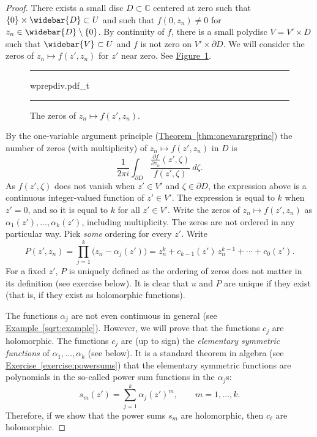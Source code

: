 \documentclass[12pt,openany]{book}
\newcommand{\C}{{\mathbb{C}}}
\theoremstyle{plain}
\theoremstyle{remark}
\theoremstyle{definition}
\newenvironment{myfig}{%
\begin{figure}[h!t]
\noindent\rule{\textwidth}{0.5pt}\vspace{12pt}\par\centering}%
{\par\noindent\rule{\textwidth}{0.5pt}
\end{figure}}
\theoremstyle{exercise}
\theoremstyle{example}
\newcommand{\figureref}[1]{\hyperref[#1]{Figure~\ref*{#1}}}
\newcommand{\exerciseref}[1]{\hyperref[#1]{Exercise~\ref*{#1}}}
\newcommand{\exampleref}[1]{\hyperref[#1]{Example~\ref*{#1}}}
\newcommand{\thmref}[1]{\hyperref[#1]{Theorem~\ref*{#1}}}
\begin{document}
\begin{proof}
There exists a small disc $D \subset \C$ centered at zero such that
$\{0\} \times \widebar{D} \subset U$ and such that
$f(0,z_n) \not= 0$ for $z_n \in \widebar{D} \setminus \{ 0 \}$.
By continuity
of $f$,
there is a small polydisc $V = V' \times D$ such that
$\widebar{V} \subset U$ and $f$ is not zero on
$V' \times \partial D$.  We will consider the zeros of
$z_n \mapsto f(z',z_n)$ for $z'$ near zero.  See \figureref{fig:wprepdiv}.

\begin{myfig}
{wprepdiv.pdf_t}
\caption{The zeros of $z_n \mapsto f(z',z_n)$.\label{fig:wprepdiv}}
\end{myfig}

By the one-variable argument principle (\thmref{thm:onevarargprinc}) the number of zeros (with
multiplicity) of $z_n
\mapsto f(z',z_n)$ in $D$ is
\begin{equation*}
\frac{1}{2\pi i}
\int_{\partial D}
\frac{\frac{\partial f}{\partial z_n} (z',\zeta)}{f(z',\zeta)} ~d\zeta .
\end{equation*}
As $f(z',\zeta)$ does not vanish when $z' \in V'$ and $\zeta \in \partial
D$,
the expression above is a continuous integer-valued
function of $z' \in V'$.
The expression
is equal to $k$ when $z'=0$, and
so it is equal to $k$ for all $z' \in V'$.
Write
the zeros of $z_n \mapsto f(z',z_n)$ as $\alpha_1(z'),\ldots,\alpha_k(z')$, including
multiplicity.  The zeros are not ordered in any particular way.
Pick \emph{some} ordering for every $z'$.
Write
\begin{equation*}
P(z',z_n)
=
\prod_{j=1}^k \bigl(z_n-\alpha_j(z')\bigr)
=
z_n^k + c_{k-1}(z') \, z_n^{k-1} + \cdots + c_0 (z') .
\end{equation*}
For a fixed $z'$, $P$ is uniquely defined as the ordering of zeros does not
matter in its definition (see exercise below).  It is
clear that
$u$ and $P$ are unique if they exist (that is, if they exist as holomorphic functions).

The functions $\alpha_j$ are not even continuous in general (see
\exampleref{sqrt:example}).  However,
we will prove that the functions $c_j$ are holomorphic.  The functions
$c_j$ are
(up to sign)
the \emph{elementary symmetric functions}
of $\alpha_1,\ldots,\alpha_k$ (see below).  It is a standard
theorem in algebra
(see \exerciseref{exercise:powersums})
that the elementary symmetric functions are
polynomials in the so-called power sum functions in the $\alpha_j$s:
\begin{equation*}
s_m(z') = \sum_{j=1}^k \alpha_j{(z')}^m , \qquad m = 1,\ldots,k.
\end{equation*}
Therefore, if we show that the power sums $s_m$ are holomorphic, then
$c_\ell$ are 
holomorphic.


\end{proof}
\end{document}
